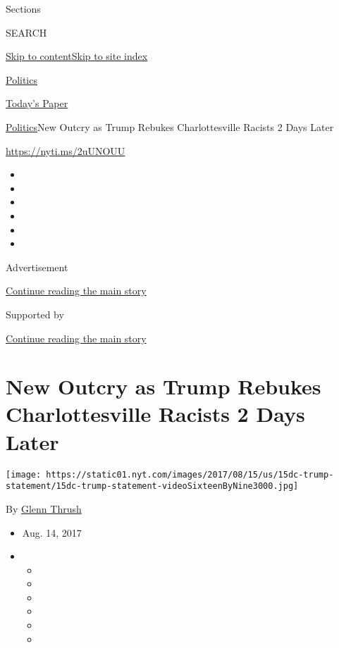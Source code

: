 Sections

SEARCH

\protect\hyperlink{site-content}{Skip to
content}\protect\hyperlink{site-index}{Skip to site index}

\href{https://www.nytimes.com/section/politics}{Politics}

\href{https://myaccount.nytimes.com/auth/login?response_type=cookie\&client_id=vi}{}

\href{https://www.nytimes.com/section/todayspaper}{Today's Paper}

\href{/section/politics}{Politics}\textbar{}New Outcry as Trump Rebukes
Charlottesville Racists 2 Days Later

\url{https://nyti.ms/2uUNOUU}

\begin{itemize}
\item
\item
\item
\item
\item
\item
\end{itemize}

Advertisement

\protect\hyperlink{after-top}{Continue reading the main story}

Supported by

\protect\hyperlink{after-sponsor}{Continue reading the main story}

\hypertarget{new-outcry-as-trump-rebukes-charlottesville-racists-2-days-later}{%
\section{New Outcry as Trump Rebukes Charlottesville Racists 2 Days
Later}\label{new-outcry-as-trump-rebukes-charlottesville-racists-2-days-later}}

\texttt{[image: https://static01.nyt.com/images/2017/08/15/us/15dc-trump-statement/15dc-trump-statement-videoSixteenByNine3000.jpg]}

By \href{https://www.nytimes.com/by/glenn-thrush}{Glenn Thrush}

\begin{itemize}
\item
  Aug. 14, 2017
\item
  \begin{itemize}
  \item
  \item
  \item
  \item
  \item
  \item
  \end{itemize}
\end{itemize}

